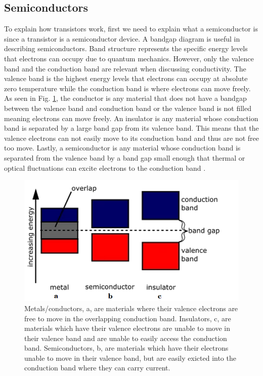 \documentclass[ notitlepage, numerical, 11pt]{revtex4-1} %
\begin{document}
\subsection{Semiconductors}
To explain how transistors work, first we need to explain what a semiconductor is since a transistor is a semiconductor device. A bandgap diagram is useful in describing semiconductors. Band structure represents the specific energy levels that electrons can occupy due to quantum mechanics. However, only the valence band and the conduction band are relevant when discussing conductivity. The valence band is the highest energy levels that electrons can occupy at absolute zero temperature while the conduction band is where electrons can move freely. As seen in Fig. \ref{bandGap}, the conductor is any material that does not have a bandgap between the valence band and conduction band or the valence band is not filled meaning electrons can move freely. An insulator is any material whose conduction band is separated by a large band gap from its valence band. This means that the valence electrons can not easily move to its conduction band and thus are not free too move. Lastly, a semiconductor is any material whose conduction band is separated from the valence band by a band gap small enough that thermal or optical fluctuations can excite electrons to the conduction band \cite{purcell}.


\begin{figure}[H]
\centerline{\includegraphics[scale=.35]{bandGap.png}}
\caption{Metals/conductors, a, are materials where their valence electrons are free to move in the overlapping conduction band. Insulators, c, are materials which have their valence electrons are unable to move in their valence band and are unable to easily access the conduction band. Semiconductors, b, are materials which have their electrons unable to move in their valence band, but are easily exicted into the conduction band where they can carry current.}
\label{bandGap}
\end{figure}
\end{document}
